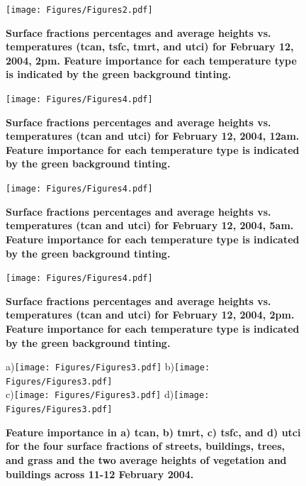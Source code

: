 \documentclass[final,3p,times,authoryear]{elsarticle}
\begin{document}
\begin{figure}
\centering
\texttt{[image: Figures/Figures2.pdf]}
\caption{\bf Surface fractions percentages and average heights vs. temperatures (\gls{tcan}, \gls{tsfc}, \gls{tmrt}, and \gls{utci}) for February 12, 2004, 2pm. Feature importance for each temperature type is indicated by the green background tinting.}
 \label{fig:box14}
\end{figure} 


\begin{figure}
\centering
\texttt{[image: Figures/Figures4.pdf]}
\caption{\bf Surface fractions percentages and average heights vs. temperatures (\gls{tcan} and \gls{utci}) for February 12, 2004, 12am. Feature importance for each temperature type is indicated by the green background tinting.}
 \label{fig:box0a}
\end{figure} 

\begin{figure}
\centering
\texttt{[image: Figures/Figures4.pdf]}
\caption{\bf Surface fractions percentages and average heights vs. temperatures (\gls{tcan} and \gls{utci}) for February 12, 2004, 5am. Feature importance for each temperature type is indicated by the green background tinting.}
 \label{fig:box5a}
\end{figure} 

\begin{figure}
\centering
\texttt{[image: Figures/Figures4.pdf]}
\caption{\bf Surface fractions percentages and average heights vs. temperatures (\gls{tcan} and \gls{utci}) for February 12, 2004, 2pm. Feature importance for each temperature type is indicated by the green background tinting.}
 \label{fig:box14a}
\end{figure} 





\begin{figure}
\centering
{\tiny a)}\texttt{[image: Figures/Figures3.pdf]}
{\tiny b)}\texttt{[image: Figures/Figures3.pdf]}\\
{\tiny c)}\texttt{[image: Figures/Figures3.pdf]}
{\tiny d)}\texttt{[image: Figures/Figures3.pdf]}
\caption{\bf Feature importance in a) \gls{tcan}, b) \gls{tmrt}, c) \gls{tsfc}, and d) \gls{utci} for the four surface fractions of streets, buildings, trees, and grass and the two average heights of vegetation and buildings across 11-12 February 2004. }
\label{fig:featimpttcan}
\label{fig:featimpttmrt}
\label{fig:featimpttsfc}
\label{fig:featimptutci}
\end{figure}
\end{document}
